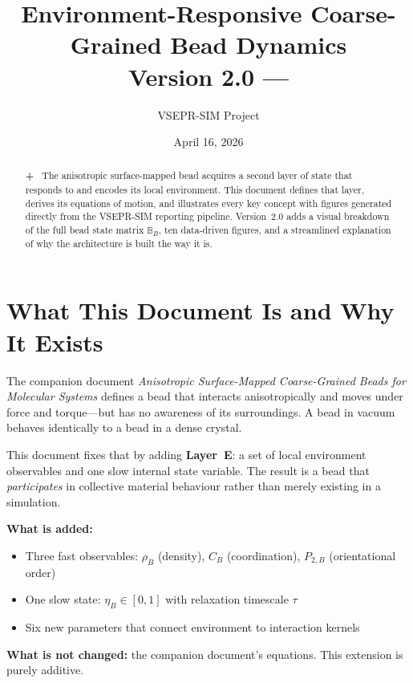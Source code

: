 \documentclass[11pt]{article}
\title{%
  \textbf{Environment-Responsive Coarse-Grained Bead Dynamics}\\[4pt]
  \large Version 2.0 --- \vsadd{with Figures, Charts, and Renderings}
}
\author{VSEPR-SIM Project}
\date{April 16, 2026}
\newcommand{\vsadd}[1]{\textcolor{vsgreen}{\textbf{+}~#1}}
\newcommand{\vsfig}[1]{\textcolor{vscyan}{#1}}
\begin{document}
\maketitle

\begin{abstract}
\vsadd{%
The anisotropic surface-mapped bead acquires a second layer of state that
responds to and encodes its local environment.  This document defines that
layer, derives its equations of motion, and \vsfig{illustrates every key
concept with figures generated directly from the VSEPR-SIM reporting
pipeline}.  Version~2.0 adds a visual breakdown of the full bead state
matrix $\mathbb{B}_B$, ten data-driven figures, and a streamlined
explanation of why the architecture is built the way it is.}
\end{abstract}

\tableofcontents
\clearpage

\section{What This Document Is and Why It Exists}

The companion document \emph{Anisotropic Surface-Mapped Coarse-Grained
Beads for Molecular Systems} defines a bead that interacts anisotropically
and moves under force and torque---but has no awareness of its surroundings.
A bead in vacuum behaves identically to a bead in a dense crystal.

This document fixes that by adding \textbf{Layer~E}: a set of local
environment observables and one slow internal state variable.  The result is
a bead that \emph{participates} in collective material behaviour rather than
merely existing in a simulation.

\medskip
\noindent
\textbf{What is added:}
\begin{itemize}
  \item Three fast observables: $\rho_B$ (density), $C_B$ (coordination),
		$P_{2,B}$ (orientational order)
  \item One slow state: $\eta_B \in [0,1]$ with relaxation timescale $\tau$
  \item Six new parameters that connect environment to interaction kernels
\end{itemize}

\noindent
\textbf{What is not changed:} the companion document's equations.  This
extension is purely additive.
\end{document}
